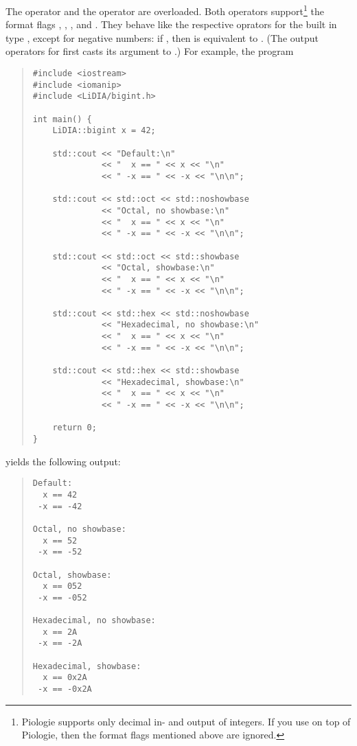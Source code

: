 The  operator \code{>>} and the  operator
\code{<<} are overloaded. Both operators support\footnote{Piologie supports
  only decimal in- and output of integers. If you use \LiDIA on top of
  Piologie, then the format flags mentioned above are ignored.}
the format flags
, , , and
. They behave like the respective oprators for the
built in type , except for negative numbers: if
, then  is equivalent to
. (The output operators for  first casts its
argument to .) For example, the program
\begin{quote}
\begin{verbatim}
#include <iostream>
#include <iomanip>
#include <LiDIA/bigint.h>

int main() {
    LiDIA::bigint x = 42;

    std::cout << "Default:\n"
              << "  x == " << x << "\n"
              << " -x == " << -x << "\n\n";

    std::cout << std::oct << std::noshowbase
              << "Octal, no showbase:\n"
              << "  x == " << x << "\n"
              << " -x == " << -x << "\n\n";
        
    std::cout << std::oct << std::showbase
              << "Octal, showbase:\n"
              << "  x == " << x << "\n"
              << " -x == " << -x << "\n\n";
        
    std::cout << std::hex << std::noshowbase
              << "Hexadecimal, no showbase:\n"
              << "  x == " << x << "\n"
              << " -x == " << -x << "\n\n";
        
    std::cout << std::hex << std::showbase
              << "Hexadecimal, showbase:\n"
              << "  x == " << x << "\n"
              << " -x == " << -x << "\n\n";

    return 0;
}
\end{verbatim}
\end{quote}
yields the following output:
\begin{quote}
\begin{verbatim}
Default:
  x == 42
 -x == -42

Octal, no showbase:
  x == 52
 -x == -52

Octal, showbase:
  x == 052
 -x == -052

Hexadecimal, no showbase:
  x == 2A
 -x == -2A

Hexadecimal, showbase:
  x == 0x2A
 -x == -0x2A

\end{verbatim}
\end{quote}


